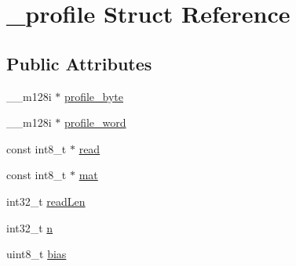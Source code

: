 \hypertarget{struct__profile}{\section{\-\_\-profile Struct Reference}
\label{struct__profile}
}
\subsection*{Public Attributes}
\begin{DoxyCompactItemize}
\item 
\-\_\-\-\_\-m128i $\ast$ \hyperlink{struct__profile_afd850a1da5fbc85c9fd0b1382608f248}{profile\-\_\-byte}
\item 
\-\_\-\-\_\-m128i $\ast$ \hyperlink{struct__profile_aedd79e623e88be9188b5c05fcfd8978d}{profile\-\_\-word}
\item 
const int8\-\_\-t $\ast$ \hyperlink{struct__profile_af911e1a81a7d7a8a74895a5a29e130ef}{read}
\item 
const int8\-\_\-t $\ast$ \hyperlink{struct__profile_a6d59f3d410fee0856d081108d25571e0}{mat}
\item 
int32\-\_\-t \hyperlink{struct__profile_ac40ce6b6e478fd12ea81e84dce46ee62}{read\-Len}
\item 
int32\-\_\-t \hyperlink{struct__profile_a369ec73dd1f3b1da33ff85edd665f8e1}{n}
\item 
uint8\-\_\-t \hyperlink{struct__profile_ad24c78ed42ad7f63b2bb378a31b9e997}{bias}
\end{DoxyCompactItemize}


